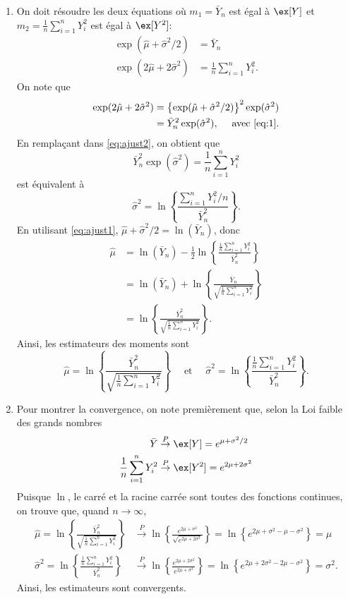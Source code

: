 \begin{exercice}
\begin{sol}
\begin{enumerate}
\item On doit résoudre les deux équations où $m_1=\bar Y_n$ est égal à $\ex[Y]$ et $m_2=\frac{1}{n}\sum_{i=1}^n Y_i^2$ est égal à $\ex[Y^2]$:
\begin{align}
\exp(\hat\mu +\hat\sigma^2/2)&=\bar Y_n \label{eq:ajust1}\\
\exp(2\hat\mu +2\hat\sigma^2 )&=\frac{1}{n}\sum_{i=1}^n Y_i^2.\label{eq:ajust2}
\end{align}
On note que
 \begin{align*}
 \exp(2\hat\mu +2\hat\sigma^2 )&=\left\{\exp(\hat\mu +\hat\sigma^2/2)\right\}^2\exp(\hat\sigma^2)\\
 &=\bar Y_n^2 \exp(\hat\sigma^2),\quad \mbox{ avec \eqref{eq:1}}.
 \end{align*}
 En remplaçant dans \eqref{eq:ajust2}, on obtient que
 $$
 \bar{Y}_n^2 \exp(\hat\sigma^2) = \frac{1}{n}\sum_{i=1}^n Y_i^2 
 $$
 est équivalent à 
 $$
 \hat\sigma^2 = \ln\left\{\frac{\sum_{i=1}^n Y_i^2/n}{\bar{Y}_n^2} \right\}.
 $$
 En utilisant \eqref{eq:ajust1}, $\hat\mu +\hat\sigma^2/2=\ln(\bar Y_n )$, donc
\begin{align*}
\hat\mu & = \ln(\bar Y_n )-\frac{1}{2}\ln\left\{\frac{\frac{1}{n}\sum_{i=1}^n Y_i^2}{\bar Y_n^2} \right\}\\
& = \ln(\bar Y_n )+\ln\left\{\frac{\bar Y_n}{\sqrt{\frac{1}{n}\sum_{i=1}^n Y_i^2}} \right\}\\
& = \ln\left\{\frac{\bar Y_n^2}{\sqrt{\frac{1}{n}\sum_{i=1}^n Y_i^2}} \right\}.
\end{align*}
Ainsi, les estimateurs des moments sont
$$
\hat \mu = \ln\left\{\frac{\bar Y_n^2}{\sqrt{\frac{1}{n}\sum_{i=1}^n Y_i^2}} \right\} \quad \mbox{ et }\quad \hat\sigma^2 = \ln\left\{\frac{\frac{1}{n}\sum_{i=1}^n Y_i^2}{\bar Y_n^2} \right\}.
$$

\item Pour montrer la convergence, on note premièrement que, selon la Loi faible des grands nombres
\begin{align*}
\bar Y &\stackrel{P}{\rightarrow} \ex[Y]=e^{\mu+\sigma^2/2}\\
\frac{1}{n}\sum_{i=1}^n Y_i^2 &\stackrel{P}{\rightarrow} \ex[Y^2]=e^{2\mu+2\sigma^2}\\
\end{align*}
Puisque $\ln$, le carré et la racine carrée sont toutes des fonctions continues, on trouve que, quand $n\to\infty$,
\begin{align*}
\hat\mu = \ln\left\{\frac{\bar Y_n^2}{\sqrt{\frac{1}{n}\sum_{i=1}^n Y_i^2}} \right\} &\stackrel{P}{\rightarrow} \ln\left\{\frac{ e^{2\mu+\sigma^2}}{\sqrt{e^{2\mu+2\sigma^2}}} \right\}=\ln\left\{ e^{2\mu+\sigma^2-\mu-\sigma^2} \right\}=\mu\\
\hat\sigma^2 = \ln\left\{\frac{\frac{1}{n}\sum_{i=1}^n Y_i^2}{\bar Y_n^2} \right\} &\stackrel{P}{\rightarrow} \ln\left\{\frac{e^{2\mu+2\sigma^2}}{e^{2\mu+\sigma^2}} \right\}=\ln\left\{e^{2\mu+2\sigma^2-2\mu-\sigma^2} \right\}=\sigma^2.
\end{align*}
Ainsi, les estimateurs sont convergents.
\end{enumerate}
\end{sol}
\end{exercice}

